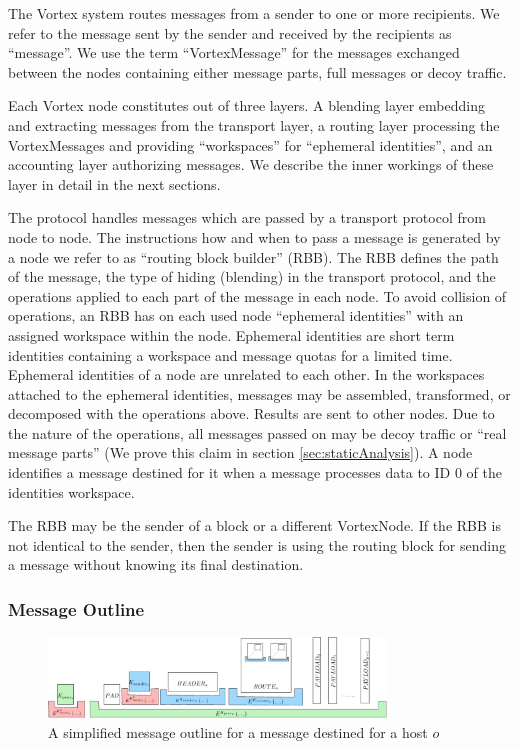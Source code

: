 \documentclass[10pt,journal,compsoc,twocolumn,twoside]{IEEEtran}
\let\MYoriglatexcaption\caption
\renewcommand{\caption}[2][\relax]{\MYoriglatexcaption[#2]{#2}}
\begin{document}
The Vortex system routes messages from a sender to one or more recipients. We refer to the message sent by the sender and received by the recipients as ``message''. We use the term ``VortexMessage'' for the messages exchanged between the nodes containing either message parts, full messages or decoy traffic.

Each Vortex node constitutes out of three layers. A blending layer embedding and extracting messages from the transport layer, a routing layer processing the VortexMessages and providing ``workspaces'' for ``ephemeral identities'', and an accounting layer authorizing messages. We describe the inner workings of these layer in detail in the next sections.

The protocol handles messages which are passed by a transport protocol from node to node. The instructions how and when to pass a message is generated by a node we refer to as ``routing block builder'' (RBB). The RBB defines the path of the message, the type of hiding (blending) in the transport protocol, and the operations applied to each part of the message in each node. To avoid collision of operations, an RBB has on each used node ``ephemeral identities'' with an assigned workspace within the node. Ephemeral identities are short term identities containing a workspace and message quotas for a limited time. Ephemeral identities of a node are unrelated to each other. In the workspaces attached to the ephemeral identities, messages may be assembled, transformed, or decomposed with the operations above. Results are sent to other nodes. Due to the nature of the operations, all messages passed on may be decoy traffic or ``real message parts'' (We prove this claim in section \ref{sec:staticAnalysis}). A node identifies a message destined for it when a message processes data to ID 0 of the identities workspace.

The RBB may be the sender of a block or a different VortexNode. If the RBB is not identical to the sender, then the sender is using the routing block for sending a message without knowing its final destination.

\subsubsection{Message Outline\label{sec:messageOutline}}
\begin{figure}[ht]
	\centering\includegraphics[width=0.8\textwidth]{blockLayoutSimplified}
	\caption{A simplified message outline for a message destined for a host $o$}
	\label{fig:messageOutline}
\end{figure}
\end{document}
